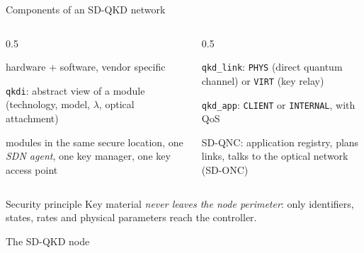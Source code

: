 \documentclass[10pt]{beamer}
\begin{document}
\begin{frame}{Components of an SD-QKD network}
  \small
  \begin{columns}[T]
    \begin{column}{0.5\textwidth}
      \begin{description}
        \item[QKD module] hardware + software, vendor specific
        \item[QKD interface] \texttt{qkdi}: abstract view of a module
              (technology, model, $\lambda$, optical attachment)
        \item[SD-QKD node] modules in the same secure location, one
              \emph{SDN agent}, one key manager, one key access point
      \end{description}
    \end{column}
    \begin{column}{0.5\textwidth}
      \begin{description}[Application]
        \item[Link] \texttt{qkd\_link}: \texttt{PHYS} (direct quantum
              channel) or \texttt{VIRT} (key relay)
        \item[Application] \texttt{qkd\_app}: \texttt{CLIENT} or
              \texttt{INTERNAL}, with QoS
        \item[Controller] SD-QNC: application registry, plans links,
              talks to the optical network (SD-ONC)
      \end{description}
    \end{column}
  \end{columns}
  \vspace{1ex}
  \begin{alertblock}{Security principle}
    Key material \emph{never leaves the node perimeter}: only identifiers,
    states, rates and physical parameters reach the controller.
  \end{alertblock}
\end{frame}

\begin{frame}{The SD-QKD node}
\end{frame}
\end{document}
